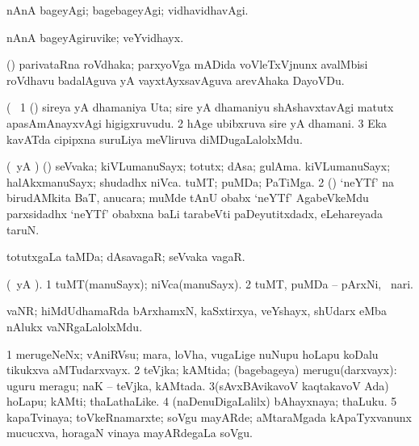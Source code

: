 \bentry
{} 
\gl{\kirxvi}
\expl{}
\bmng
 nAnA bageyAgi; bagebageyAgi; vidhavidhavAgi. 
\emng
\eentry

\bentry
{} 
\gl{\nA}
\expl{}
\bmng
 nAnA bageyAgiruvike; veYvidhayx. 
\emng
\eentry

\bentry
{} 
\gl{\nA}
\expl{}
\bmng
 (\viduyx) parivataRna roVdhaka; parxyoVga mADida voVleTxVjnunx avalMbisi roVdhavu badalAguva yA vayxtAyxsavAguva arevAhaka DayoVDu. 
\emng
\eentry

\bentry
{} 
\gl{\nA}(\bava\ 
\bmng
\bnum
\num{1} (\veYshA) sireya yA dhamaniya Uta; sire yA dhamaniyu shAshavxtavAgi matutx apasAmAnayxvAgi higigxruvudu. 
\num{2} hAge ubibxruva sire yA dhamani. 
\num{3} Eka kavATda cipipxna suruLiya meVliruva diMDugaLalolxMdu. 
\enum
\emng
\eentry

\bentry
{} 
\gl{\nA}
\bmng
\bnum
{} (\pArxparx\ yA \hA) 
\banum
{} (\hiV) seVvaka; kiVLumanuSayx; totutx; dAsa; gulAma. 
 kiVLumanuSayx; halAkxmanuSayx; shudadhx niVca. 
 tuMT; puMDa; PaTiMga. 
\eanum
\numie
\num{2} (\ca) `neYTf' na birudAMkita BaT, anucara; muMde tAnU obabx `neYTf' AgabeVkeMdu parxsidadhx `neYTf' obabxna baLi tarabeVti paDeyutitxdadx, eLehareyada taruN. 
\enum
\emng
\eentry

\bentry
{} 
\gl{\nA}
\expl{}
\bmng
 totutxgaLa taMDa; dAsavagaR; seVvaka vagaR. 
\emng
\eentry

\bentry
{} 
\gl{\nA}
\expl{}
\bmng
 (\pArxM\ yA \ame). 
\bnum
\num{1} tuMT(manuSayx); niVca(manuSayx). 
\num{2} tuMT, puMDa -- pArxNi, \kanmu\ nari. 
\enum
\emng
\eentry

\bentry
{} 
\gl{\nA}
\expl{}
\bmng
 vaNR; hiMdUdhamaRda bArxhamxN, kaSxtirxya, veYshayx, shUdarx eMba nAlukx vaNRgaLalolxMdu. 
\emng
\eentry

\bentry
{} 
\gl{\nA}
\expl{}
\bmng
\bnum
\num{1} merugeNeNx; vAniRVsu; mara, loVha, \mo vugaLige nuNupu hoLapu koDalu tikukxva aMTudarxvayx. 
\num{2} teVjka; kAMtida; (bagebageya) merugu(darxvayx):  uguru meragu; naK -- teVjka, kAMtada. 
\num{3}(sAvxBAvikavoV kaqtakavoV Ada) hoLapu; kAMti; thaLathaLike. 
\num{4} (naDenuDigaLalilx) bAhayxnaya; thaLuku. 
\num{5} kapaTvinaya; toVkeRnamarxte; soVgu mayARde; aMtaraMgada kApaTyxvanunx mucucxva, horagaN vinaya mayARdegaLa soVgu. 
\enum
\emng
\eentry


